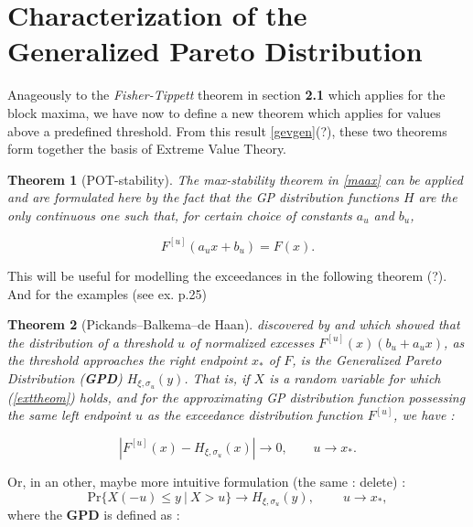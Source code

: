 \documentclass[11pt,a4paper,openany ]{book}
\newtheorem{theorem}{Theorem}[chapter]
\begin{document}
\section{Characterization of the Generalized Pareto Distribution}

Anageously to the \emph{Fisher-Tippett} theorem in section \textbf{2.1} which applies for the block maxima, we have now to define a new theorem which applies for values above a predefined threshold. From this result \ref{gevgen}(?), these two theorems form together the basis of Extreme Value Theory.

\begin{theorem}[POT-stability]\emph{\citet[pp.25]{reiss_statistical_2007}} The max-stability theorem in \ref{maax} can be applied and are formulated here by the fact that the GP distribution functions $H$ are the only continuous one such that, for certain choice of constants $a_u$ and $b_u$, 
	
	\begin{equation*}
	F^{[u]}(a_ux+b_u)=F(x).
	\end{equation*}
\end{theorem}
This will be useful for modelling the exceedances in the following theorem (?). And for the examples (see ex. p.25)

\begin{theorem}[Pickands–Balkema–de Haan]
	discovered by \emph{\cite{balkema_residual_1974}} and\emph{\cite{iii_statistical_1975-1}}
	which showed that the distribution of a threshold $u$ of normalized excesses $F^{[u]}(x)(b_u+a_ux)$, as the threshold approaches the right endpoint $x_*$ of $F$, is the Generalized Pareto Distribution (\textbf{GPD}) $H_{\xi,\sigma_u}(y)$. That is, if $X$ is a random variable for which (\ref{exttheom}) holds, and for the approximating GP distribution function possessing the same left endpoint $u$ as the exceedance distribution function $F^{[u]}$, we have \emph{\citet[pp.27]{reiss_statistical_2007}}: 
	
	\begin{equation*}
	|F^{[u]}(x)-H_{\xi,\sigma_u}(x)|\longrightarrow 0, \ \ \ \ \ \ \ \ \ u\to x_*.
	\end{equation*}
\end{theorem}
Or, in an other, maybe more intuitive formulation (the same : delete) \cite{coles_introduction_2001} :
\begin{equation} \label{gpdconv}
\text{Pr}\big\{X(-u)\leq y\ |\ X>u\big\}\longrightarrow H_{\xi,\sigma_u}(y), \ \ \ \ \ \ \ \ \ \ u\to x_*,
\end{equation}
where the \textbf{GPD} is defined as :
\end{document}
